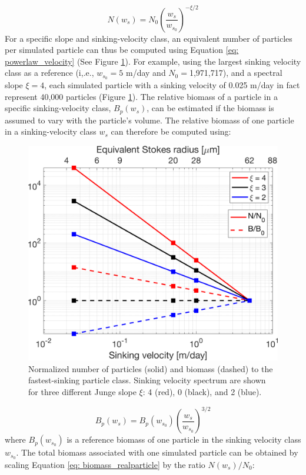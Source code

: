 \documentclass[draft,linenumbers]{agujournal2018}
\begin{document}
\begin{equation}
N(w_s) = N_0 \left(\frac{w_s}{w_{s_0}}\right)^{-\xi/2}
\label{eq: powerlaw_velocity}
\end{equation}
For a specific slope and sinking-velocity class, an equivalent number of particles per simulated particle can thus be computed using Equation \ref{eq: powerlaw_velocity} (See Figure \ref{fig: sinking_velocity_spectrum}). For example, using the largest sinking velocity class as a reference (i,.e., $w_{s_0} = 5$ m/day and $N_0=$1,971,717), and a spectral slope $\xi = 4$, each simulated particle with a sinking velocity of 0.025 m/day in fact represent 40,000 particles (Figure \ref{fig: sinking_velocity_spectrum}). The relative biomass of a particle in a specific sinking-velocity class, $B_p(w_s)$, can be estimated if the biomass is assumed to vary with the particle's volume. The relative biomass of one particle in a sinking-velocity class $w_s$ can therefore be computed using:

\begin{figure}[ht]
	\centering
	\includegraphics[width = .6\linewidth]{figures/Fig4_particle_PDF}
	\caption{Normalized number of particles (solid) and biomass (dashed) to the fastest-sinking particle class. Sinking velocity spectrum are shown for three different Junge slope $\xi$: 4 (red), 0 (black), and 2 (blue).}
	\label{fig: sinking_velocity_spectrum}
\end{figure}

\begin{equation}
	B_p(w_s) = B_p(w_{s_0})\left(\frac{w_s}{w_{s_0}}\right)^{3/2}
	\label{eq: biomass_realparticle}
\end{equation}
where $B_p(w_{s_0})$ is a reference biomass of one particle in the sinking velocity class $w_{s_0}$. The total biomass associated with one simulated particle can be obtained by scaling Equation \ref{eq: biomass_realparticle} by the ratio $N(w_s)/N_0$:
\end{document}
